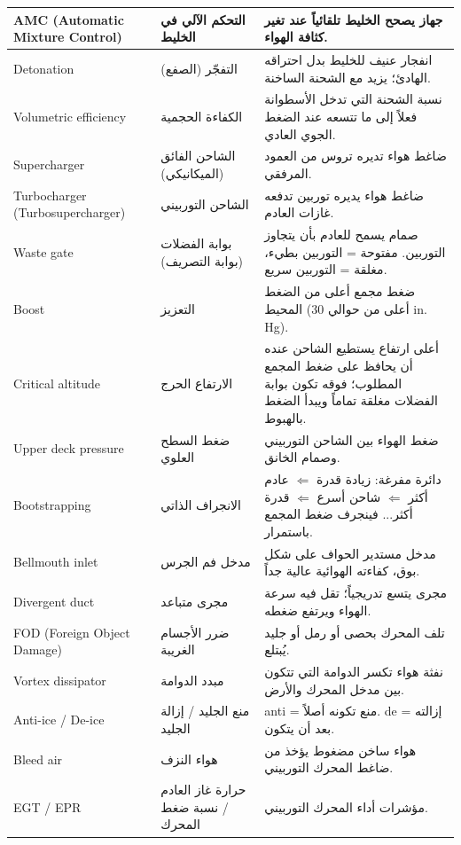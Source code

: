 \documentclass[11pt,a4paper]{article}
\newcommand{\en}[1]{\textenglish{#1}}
\begin{document}
\begin{longtable}{|>{\raggedleft\arraybackslash}p{4.2cm}|>{\raggedleft\arraybackslash}p{3.6cm}|>{\raggedleft\arraybackslash}p{7.2cm}|}
\en{AMC (Automatic Mixture Control)} & التحكم الآلي في الخليط & جهاز يصحح الخليط تلقائياً عند تغير كثافة الهواء.\\\hline
\en{Detonation} & التفجّر (الصفع) & انفجار عنيف للخليط بدل احتراقه الهادئ؛ يزيد مع الشحنة الساخنة.\\\hline
\en{Volumetric efficiency} & الكفاءة الحجمية & نسبة الشحنة التي تدخل الأسطوانة فعلاً إلى ما تتسعه عند الضغط الجوي العادي.\\\hline
\en{Supercharger} & الشاحن الفائق (الميكانيكي) & ضاغط هواء تديره تروس من العمود المرفقي.\\\hline
\en{Turbocharger (Turbosupercharger)} & الشاحن التوربيني & ضاغط هواء يديره توربين تدفعه غازات العادم.\\\hline
\en{Waste gate} & بوابة الفضلات (بوابة التصريف) & صمام يسمح للعادم بأن يتجاوز التوربين. مفتوحة = التوربين بطيء، مغلقة = التوربين سريع.\\\hline
\en{Boost} & التعزيز & ضغط مجمع أعلى من الضغط المحيط (أعلى من حوالي 30 \en{in. Hg}).\\\hline
\en{Critical altitude} & الارتفاع الحرج & أعلى ارتفاع يستطيع الشاحن عنده أن يحافظ على ضغط المجمع المطلوب؛ فوقه تكون بوابة الفضلات مغلقة تماماً ويبدأ الضغط بالهبوط.\\\hline
\en{Upper deck pressure} & ضغط السطح العلوي & ضغط الهواء بين الشاحن التوربيني وصمام الخانق.\\\hline
\en{Bootstrapping} & الانجراف الذاتي & دائرة مفرغة: زيادة قدرة $\Leftarrow$ عادم أكثر $\Leftarrow$ شاحن أسرع $\Leftarrow$ قدرة أكثر... فينجرف ضغط المجمع باستمرار.\\\hline
\en{Bellmouth inlet} & مدخل فم الجرس & مدخل مستدير الحواف على شكل بوق، كفاءته الهوائية عالية جداً.\\\hline
\en{Divergent duct} & مجرى متباعد & مجرى يتسع تدريجياً؛ تقل فيه سرعة الهواء ويرتفع ضغطه.\\\hline
\en{FOD (Foreign Object Damage)} & ضرر الأجسام الغريبة & تلف المحرك بحصى أو رمل أو جليد يُبتلع.\\\hline
\en{Vortex dissipator} & مبدد الدوامة & نفثة هواء تكسر الدوامة التي تتكون بين مدخل المحرك والأرض.\\\hline
\en{Anti-ice / De-ice} & منع الجليد / إزالة الجليد & \en{anti} = منع تكونه أصلاً. \en{de} = إزالته بعد أن يتكون.\\\hline
\en{Bleed air} & هواء النزف & هواء ساخن مضغوط يؤخذ من ضاغط المحرك التوربيني.\\\hline
\en{EGT / EPR} & حرارة غاز العادم / نسبة ضغط المحرك & مؤشرات أداء المحرك التوربيني.\\\hline
\end{longtable}
\end{document}
